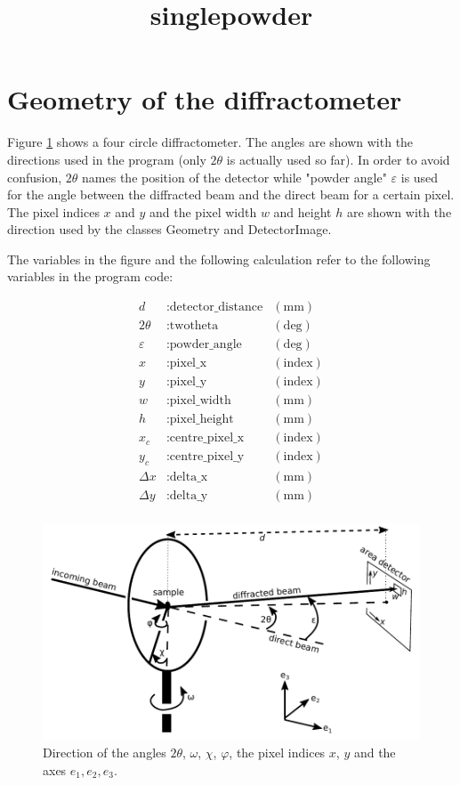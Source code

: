 \documentclass[a4paper, 12pt, twoside]{scrartcl}
\title{singlepowder}
\begin{document}
\maketitle

\section{Geometry of the diffractometer}

Figure \ref{fig:goniometer} shows a four circle diffractometer. The angles are shown with the directions used in the program (only $ 2\theta $ is actually used so far). In order to avoid confusion, $ 2\theta $ names the position of the detector while "powder angle" $ \varepsilon $ is used for the angle between the diffracted beam and the direct beam for a certain pixel. The pixel indices $ x $ and $ y $ and the pixel width $ w $ and height $ h $ are shown with the direction used by the classes Geometry and DetectorImage.

The variables in the figure and the following calculation refer to the following variables in the program code:

\begin{align*}
	d &: \text{detector\_distance} & (\mathrm{mm})\\
	2\theta &: \text{twotheta} & (\mathrm{deg})\\
	\varepsilon &: \text{powder\_angle} & (\mathrm{deg})\\
	x &: \text{pixel\_x} & (\mathrm{index})\\
	y &: \text{pixel\_y} & (\mathrm{index})\\
	w &: \text{pixel\_width} & (\mathrm{mm})\\
	h &: \text{pixel\_height} & (\mathrm{mm})\\
	x_c &: \text{centre\_pixel\_x} & (\mathrm{index})\\
	y_c &: \text{centre\_pixel\_y} & (\mathrm{index})\\
	\Delta x &: \text{delta\_x} & (\mathrm{mm})\\
	\Delta y &: \text{delta\_y} & (\mathrm{mm})\\
\end{align*}

\begin{figure}
\includegraphics{figs/goniometer.pdf}
\caption{\label{fig:goniometer}Direction of the angles $ 2\theta $, $ \omega $, $ \chi $, $ \varphi $, the pixel indices $ x $, $ y $ and the axes $ e_1, e_2, e_3 $.}
\end{figure}
\end{document}
